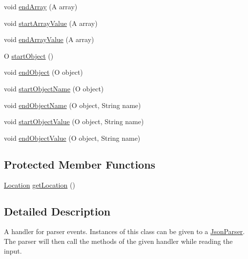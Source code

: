 \begin{DoxyCompactItemize}
\item 
void \hyperlink{classcom_1_1ingeniigroup_1_1stratux_1_1_tools_1_1_json_micro_1_1_json_handler_a7581918f0280246021ef7a412799c83e}{end\+Array} (A array)
\item 
void \hyperlink{classcom_1_1ingeniigroup_1_1stratux_1_1_tools_1_1_json_micro_1_1_json_handler_a03ddf36555b07749d572a8cd198ba560}{start\+Array\+Value} (A array)
\item 
void \hyperlink{classcom_1_1ingeniigroup_1_1stratux_1_1_tools_1_1_json_micro_1_1_json_handler_a9422ede722201e9dad0ad76cdb39337d}{end\+Array\+Value} (A array)
\item 
O \hyperlink{classcom_1_1ingeniigroup_1_1stratux_1_1_tools_1_1_json_micro_1_1_json_handler_aeabcd8c9629a3266d432eaada3e62a01}{start\+Object} ()
\item 
void \hyperlink{classcom_1_1ingeniigroup_1_1stratux_1_1_tools_1_1_json_micro_1_1_json_handler_a69a20ab01f45047859cc918bb04b4610}{end\+Object} (O object)
\item 
void \hyperlink{classcom_1_1ingeniigroup_1_1stratux_1_1_tools_1_1_json_micro_1_1_json_handler_a8b8821ca4e2ce2a3eb344bd1d9d2a7b9}{start\+Object\+Name} (O object)
\item 
void \hyperlink{classcom_1_1ingeniigroup_1_1stratux_1_1_tools_1_1_json_micro_1_1_json_handler_af58e640747c6782ac1052c2307d82e24}{end\+Object\+Name} (O object, String name)
\item 
void \hyperlink{classcom_1_1ingeniigroup_1_1stratux_1_1_tools_1_1_json_micro_1_1_json_handler_a914e825b6dbf28fff7794ebfc3f56d36}{start\+Object\+Value} (O object, String name)
\item 
void \hyperlink{classcom_1_1ingeniigroup_1_1stratux_1_1_tools_1_1_json_micro_1_1_json_handler_a257cc5c99fdcc737abe43c218ada5a10}{end\+Object\+Value} (O object, String name)
\end{DoxyCompactItemize}
\subsection*{Protected Member Functions}
\begin{DoxyCompactItemize}
\item 
\hyperlink{classcom_1_1ingeniigroup_1_1stratux_1_1_tools_1_1_json_micro_1_1_location}{Location} \hyperlink{classcom_1_1ingeniigroup_1_1stratux_1_1_tools_1_1_json_micro_1_1_json_handler_acf54207d456ddecc995f69bcfa22b1dd}{get\+Location} ()
\end{DoxyCompactItemize}


\subsection{Detailed Description}
A handler for parser events. Instances of this class can be given to a \hyperlink{classcom_1_1ingeniigroup_1_1stratux_1_1_tools_1_1_json_micro_1_1_json_parser}{Json\+Parser}. The parser will then call the methods of the given handler while reading the input. 

